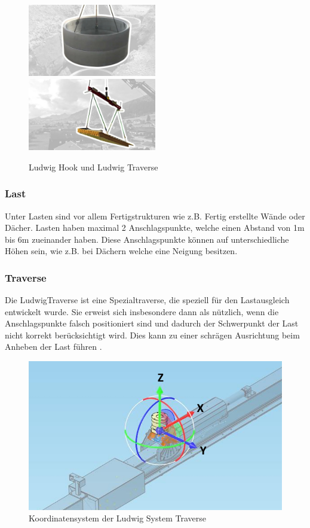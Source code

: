 \begin{figure}[H]
    \centering
    \includegraphics[width=0.5\textwidth]{graphics/Betonelement.jpg}\hfill%
    \includegraphics[width=0.5\textwidth]{graphics/Traverse.jpg}
    \caption{Ludwig Hook und Ludwig Traverse}
    \label{fig:ludwig}
\end{figure}

\subsubsection{Last}
Unter Lasten sind vor allem Fertigstrukturen wie z.B. Fertig erstellte Wände oder Dächer. 
Lasten haben maximal 2 Anschlagspunkte, welche einen Abstand von 1m bis 6m zueinander haben.
Diese Anschlagspunkte können auf unterschiedliche Höhen sein, wie z.B. bei Dächern welche eine
Neigung besitzen.

\subsubsection{Traverse}
Die LudwigTraverse ist eine Spezialtraverse, die speziell für den Lastausgleich entwickelt 
wurde. Sie erweist sich insbesondere dann als nützlich, wenn die Anschlagspunkte 
falsch positioniert sind und dadurch der Schwerpunkt der Last nicht korrekt berücksichtigt wird. 
Dies kann zu einer schrägen Ausrichtung beim Anheben der Last führen \cite{ludwigTraverse}.

\begin{figure}[H]
    \centering
    \includegraphics[width=0.5\linewidth]{graphics/Traverse_Rotationen.PNG}
    \caption{Koordinatensystem der Ludwig System Traverse}
    \label{fig:traverse}
\end{figure}

